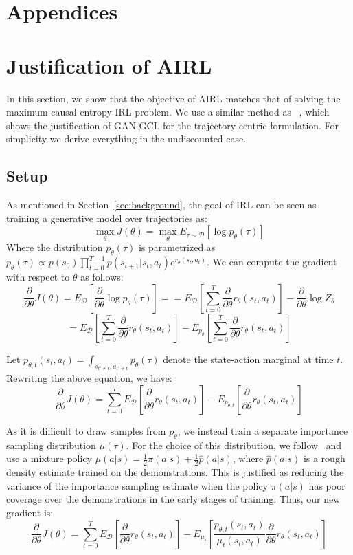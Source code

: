 \documentclass{article} \usepackage{iclr2018_conference,times}
\newcommand{\partheta}{\frac{\partial}{\partial\theta}}
\begin{document}
\clearpage
\appendix
\section*{Appendices}

\section{Justification of AIRL}
\label{app:gan_irl_proof}
In this section, we show that the objective of AIRL matches that of solving the maximum causal entropy IRL problem. We use a similar method as ~\citet{Finn16b}, which shows the justification of GAN-GCL for the trajectory-centric formulation. For simplicity we derive everything in the undiscounted case.

\subsection{Setup}






As mentioned in Section~\ref{sec:background}, the goal of IRL can be seen as training a generative model over trajectories as:
\[
\max_\theta J(\theta) = \max_\theta E_{\tau \sim \mathcal{D}}[\log p_\theta(\tau)]
\]
Where the distribution $p_\theta(\tau)$ is parametrized as $p_\theta(\tau) \propto p(s_0)\prod_{t=0}^{T-1} p(s_{t+1}|s_t, a_t) e^{r_\theta(s_t, a_t)}$. We can compute the gradient with respect to $\theta$ as follows:
\[
\partheta J(\theta) = E_{\mathcal{D}}[\partheta \log p_\theta(\tau)] =
= E_{\mathcal{D}}[\sum_{t=0}^T \partheta r_\theta(s_t, a_t)] - \partheta \log Z_\theta
\]\[
= E_{\mathcal{D}}[\sum_{t=0}^T \partheta r_\theta(s_t, a_t)] - E_{p_\theta}[\sum_{t=0}^T  \partheta r_\theta(s_t, a_t)]
\]

Let $p_{\theta,t}(s_t, a_t) = \int_{s_{t'\neq t}, a_{t' \neq t}}p_\theta(\tau)$ denote the state-action marginal at time $t$. Rewriting the above equation, we have:
\[
\partheta J(\theta) = \sum_{t=0}^T E_{\mathcal{D}}[\partheta r_\theta(s_t, a_t)] - E_{p_{\theta, t}}[\partheta r_\theta(s_t, a_t)]
\]

As it is difficult to draw samples from $p_\theta$, we instead train a separate importance sampling distribution $\mu(\tau)$. For the choice of this distribution, we follow~\citet{Finn16b} and use a mixture policy $\mu(a|s) = \frac{1}{2}\pi(a|s) + \frac{1}{2}\hat{p}(a|s)$, where $\hat{p}(a|s)$ is a rough density estimate trained on the demonstrations. This is justified as reducing the variance of the importance sampling estimate when the policy $\pi(a|s)$ has poor coverage over the demonstrations in the early stages of training. Thus, our new gradient is:
\begin{equation}
\label{eqn:gcl_cost_obj_mu}
\partheta J(\theta) = \sum_{t=0}^T E_{\mathcal{D}}[\partheta r_\theta(s_t, a_t)] - E_{\mu_t}[\frac{p_{\theta, t}(s_t,a_t)}{\mu_t(s_t,a_t)} \partheta r_\theta(s_t, a_t)]
\end{equation}
\end{document}
